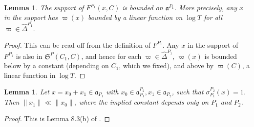 \documentclass[11pt]{amsart}
\newtheorem{lemma}[theorem]{Lemma}
\numberwithin{theorem}{section}
\numberwithin{equation}{section}
\theoremstyle{remark}
\theoremstyle{definition}
\newcommand{\ga}{\mathfrak{a}}
\begin{document}
\begin{lemma} \label{lemma:umg1}
The support of $F^{P_1}(x, C)$ is bounded on $\ga^{P_1}$. More precisely, any $x$ in the support has $\varpi(x)$ bounded by a linear function on $\log T$ for all $\varpi \in \widehat\Delta^{P_1}$.
\end{lemma}
\begin{proof}
This can be read off from the definition of $F^{P_1}$. Any $x$ in the support of $F^{P_1}$ is also in $\mathfrak S^P(C_1,C)$, and hence for each $\varpi \in \widehat\Delta^{P_1}$, $\varpi(x)$ is bounded below by a constant (depending on $C_1$, which we fixed), and above by $\varpi(C)$, a linear function in $\log T$. 
\end{proof}

\begin{lemma} \label{lemma:umg1'}
Let $x = x_0 + x_1 \in \ga_{P_1}$ with $x_0 \in \ga_{P_1}^{P_2}, x_1 \in \ga_{P_2}$, such that $\sigma_{P_1}^{P_2}(x) = 1$. Then $\|x_1\| \ll \|x_0\|$, where the implied constant depends only on $P_1$ and $P_2$.
\end{lemma}
\begin{proof}
This is Lemma 8.3(b) of \cite{Art05}.
\end{proof}
\end{document}
